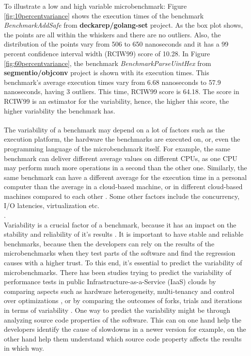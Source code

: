 \documentclass{seal_thesis}
\begin{document}
\noindent To illustrate a low and high variable microbenchmark: Figure \ref{fig:10percentvariance} shows the execution times of the benchmark \textit{BenchmarkAddSafe} from \textbf{deckarep/golang-set} project\cite{deckarep/golang-set}. As the box plot shows, the points are all within the whiskers and there are no outliers. Also, the distribution of the points vary from 506 to 650 nanoseconds and it has a 99 percent confidence interval width (RCIW99) score of 10.28. In Figure \ref{fig:60percentvariance}, the benchmark \textit{BenchmarkParseUintHex} from \textbf{segmentio/objconv} project \cite{segmentio/objconv} is shown with its execution times. This benchmark's average execution times vary from 6.68 nanoseconds to 57.9 nanoseconds, having 3 outliers. This time, RCIW99 score is 64.18. The  score in RCIW99 is an estimator for the variability, hence, the higher this score, the higher variability the benchmark has.\\
\\
The variability of a benchmark may depend on a lot of factors such as the execution platform, the hardware the benchmarks are executed on, or, even the programming language of the microbenchmark itself\cite{laaber2018performance}. For example, the same benchmark can deliver different average values on different CPUs, as one CPU may perform much more operations in a second than the other one. Similarly, the same benchmark can have a different average for the execution time in a personal computer than the average in a cloud-based machine, or in different cloud-based machines compared to each other \cite{laaber2019software}. Some other factors include the concurrency, I/O latencies, virtualization etc.\\ \cite{laaber2019software}.
\\
Variability is a crucial factor of a benchmark, because it has an impact on the stability and reliability of it's results \cite{Laaber:2018:EOS:3196398.3196407}. It is important to have stable and reliable benchmarks, because then the developers can rely on the results of the microbenchmarks when they test parts of the software and find the regression causes with a higher trust. To this end, it's essential to predict the variability of microbenchmarks. There has been studies trying to predict the variability of performance tests in public Infrastructure-as-a-Service (IaaS) clouds by comparing aspects such as hardware heterogeneity, multi-tenancy and control over optimizations \cite{Leitner:2016:PCS:2926746.2885497}, or by comparing the outcomes of forks, trials and iterations in terms of variability \cite{laaber2019software}. One way to predict the variability might be through analyzing source code properties of the software. This can on one hand help the developers identify the cause of slowdowns in a newer version for example, on the other hand help them understand which source code property affects the results in which way.\\
\end{document}
